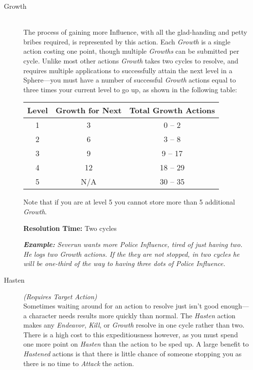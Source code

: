 \begin{description}
	\item[Growth] \hfill \\
		The process of gaining more Influence, with all the glad-handing and petty bribes required, is represented 
		by this action.  Each \emph{Growth} is a single action costing one point, though multiple \emph{Growths} can 
		be submitted per cycle.  Unlike most other actions \emph{Growth} takes two cycles to resolve, and requires multiple 
		applications to successfully attain the next level in a Sphere---you must have a number of successful 
		\emph{Growth} actions equal to three times your current level to go up, as shown in the following table:
		
\begin{center}
{\footnotesize
\begin{tabular}{| c | c | c |}
	\hline
	\textbf{Level} & \textbf{Growth for Next} & \textbf{Total Growth Actions} \\
	\hline
	1 & 3 & 0 -- 2 \\
	2 & 6 & 3 -- 8 \\
	3 & 9 & 9 -- 17 \\
	4 & 12 & 18 -- 29 \\
	5 & N/A & 30 -- 35 \\
	\hline
\end{tabular}
}
\end{center}

		Note that if you are at level 5 you cannot store more than 5 additional \emph{Growth}.
		
		\textbf{Resolution Time:} Two cycles
		
		\emph{\textbf{Example:} Severun wants more \emph{Police} Influence, tired of just having two.  He logs 
		two \emph{Growth} actions.  If the they are not stopped, in two cycles he will be one-third of the way 
		to having three dots of \emph{Police} Influence.} \\
		
	\item[Hasten] \emph{(Requires Target Action)} \hfill \\
		Sometimes waiting around for an action to resolve just isn't good enough---a character needs results more 
		quickly than normal.  The \emph{Hasten} action makes any \emph{Endeavor}, \emph{Kill}, or \emph{Growth} 
		resolve in one cycle rather than two.  There is a high cost to this expeditiousness however, as you must 
		spend one more point on \emph{Hasten} than the action to be sped up.  A large benefit to \emph{Hastened} 
		actions is that there is little chance of someone stopping you as there is no time to \emph{Attack} the 
		action.
		

\end{description}

